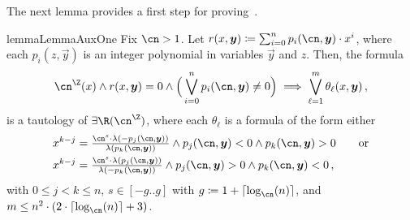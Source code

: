   The next lemma provides a first step for proving~.

  \begin{restatable}{lemma}{LemmaAuxOne}\label{aux-lemma:one}
    Fix $\cn > 1$.
    Let $r(x,\vec y) \coloneqq \sum_{i=0}^n p_i(\cn,\vec y) \cdot x^i$, where 
    each $p_i(z,\vec y)$ is an integer polynomial in variables $\vec y$ and $z$.
    Then, the formula
    \begin{equation*}
        \ipow{\cn}(x) \wedge r(x,\vec y)=0 \land \Big(\bigvee_{i=0}^n p_i(\cn,\vec y) \neq 0\Big) \implies 
        \bigvee_{\ell = 1}^m \theta_\ell (x, \vec y)\,,
    \end{equation*}
    is a tautology of $\exists\R(\ipow{\cn})$, where each $\theta_\ell$ is a formula 
    of the form either 
    \begin{align*} 
      & x^{k-j} = \textstyle\frac{\cn^s \cdot \lambda(-p_j(\cn,\vec y))}
      {\lambda(p_k(\cn,\vec y))} \land p_j(\cn,\vec y) < 0 \land p_k(\cn,\vec y) > 0 \qquad\text{or}\\
      & x^{k-j}= \textstyle\frac{\cn^s \cdot \lambda(p_j(\cn,\vec y))}{\lambda(-p_k(\cn,\vec y))} \land p_j(\cn,\vec y) > 0 \land p_k(\cn,\vec y) < 0\,,
    \end{align*}
    with $0\leq j < k \leq n$, $s \in [-g..g]$ with $g \coloneqq 1+\ceil{\log_{\cn}(n)}$,
    and $m\leq n^2\cdot \left(2 \cdot \ceil{\log_{\cn}(n)} + 3\right)$.
  \end{restatable}

